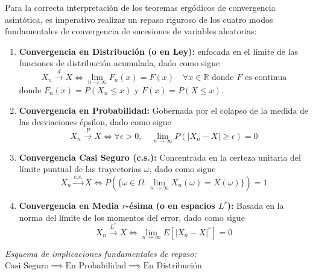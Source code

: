 \begin{observacion}
    Para la correcta interpretación de los teoremas ergódicos de convergencia asintótica, es imperativo realizar un repaso riguroso de los cuatro modos fundamentales de convergencia de sucesiones de variables aleatorias:
    \begin{enumerate}
        \item \textbf{Convergencia en Distribución (o en Ley):} enfocada en el límite de las funciones de distribución acumulada, dado como sigue
        $$ X_n \xrightarrow{d} X \iff \lim_{n \to \infty} F_n(x) = F(x) \quad \forall x \in \mathbb{R} \text{ donde } F \text{ es continua} $$
        donde $F_n(x) = P(X_n \leq x)$ y $F(x) = P(X \leq x)$.
        \item \textbf{Convergencia en Probabilidad:} Gobernada por el colapso de la medida de las desviaciones épsilon, dado como sigue
        $$ X_n \xrightarrow{P} X \iff \forall \epsilon > 0, \quad \lim_{n \to \infty} P(|X_n - X| \geq \epsilon) = 0 $$
        \item \textbf{Convergencia Casi Seguro (c.s.):} Concentrada en la certeza unitaria del límite puntual de las trayectorias $\omega$, dado como sigue
        $$ X_n \xrightarrow{c.s.} X \iff P\left( \{\omega \in \Omega : \lim_{n \to \infty} X_n(\omega) = X(\omega)\} \right) = 1 $$
        \item \textbf{Convergencia en Media $r$-ésima (o en espacios $L^r$):} Basada en la norma del límite de los momentos del error, dado como sigue
        $$ X_n \xrightarrow{L^r} X \iff \lim_{n \to \infty} E\left[ |X_n - X|^r \right] = 0 $$
    \end{enumerate}
    \begin{center}
        \textit{Esquema de implicaciones fundamentales de repaso:} \quad $\text{Casi Seguro} \implies \text{En Probabilidad} \implies \text{En Distribución}$
    \end{center}
\end{observacion}

